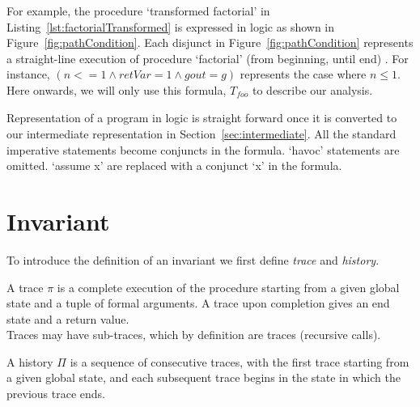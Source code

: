 \documentclass{llncs}
\newcommand{\foo}{\textit{foo}}
\newcommand{\trace}{\pi}
\newcommand{\history}{\Pi}
\newcommand{\pathCondition}{\mathit{T_{\foo}}}
\begin{document}
For example, the procedure `transformed factorial' in
Listing~\ref{lst:factorialTransformed} is expressed in logic as shown
in Figure~\ref{fig:pathCondition}. Each disjunct in
Figure~\ref{fig:pathCondition} represents a straight-line execution of
procedure `factorial' (from beginning, until end) . For instance, $(n
<= 1 \wedge retVar = 1 \wedge gout = g)$ represents the case where $n
\leq 1$. Here onwards, we will only use this formula, $\pathCondition$
to describe our analysis.



Representation of a program in logic is straight forward once it is
converted to our intermediate representation in
Section~\ref{sec:intermediate}. All the standard imperative statements
become conjuncts in the formula. `havoc' statements are omitted.
`assume x' are replaced with a conjunct `x' in the formula.

\section{Invariant}

To introduce the definition of an invariant we first define
\textit{trace} and \textit{history}.

\begin{definition}[trace]
  A trace $\trace$ is a complete execution of the procedure starting
  from a given global state and a tuple of formal arguments. A trace
  upon completion gives an end state and a return value.\\ 
 Traces may have sub-traces, which by definition are traces
  (recursive calls).
\end{definition}

\begin{definition}[history]
  A history $\history$ is a sequence of consecutive traces, with the
  first trace starting from a given global state, and each subsequent
  trace begins in the state in which the previous trace ends.
\end{definition}
\end{document}
